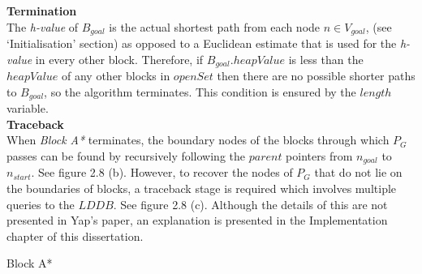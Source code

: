 \documentclass[12pt,notitlepage]{report}
\begin{document}
\noindent
{\bfseries Termination}\\
\noindent
The {\em h-value} of $B_{goal}$ is the actual shortest path from each node $n \in V_{goal}$, (see `Initialisation' section) as opposed to a Euclidean estimate that is used for the {\em h-value} in every other block. Therefore, if $B_{goal}.heapValue$ is less than the $heapValue$ of any other blocks in $openSet$ then there are no possible shorter paths to $B_{goal}$, so the algorithm terminates. This condition is ensured by the $length$ variable.\\

\noindent
{\bfseries Traceback}\\
\noindent
When {\em Block A*} terminates, the boundary nodes of the blocks through which $P_{G}$ passes can be found by recursively following the $parent$ pointers from $n_{goal}$ to $n_{start}$. See figure 2.8 (b). However, to recover the nodes of $P_{G}$ that do not lie on the boundaries of blocks, a traceback stage is required which involves multiple queries to the $LDDB$. See figure 2.8 (c). Although the details of this are not presented in Yap's paper, an explanation is presented in the Implementation chapter of this dissertation.\\

\begin{algorithm}
  \SetAlgoLined\DontPrintSemicolon

 \setcounter{AlgoLine}{0}
 
  \caption{{\sc Block A*}}
\end{algorithm} 
\end{document}
